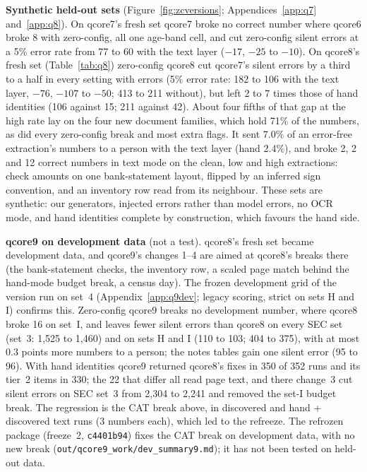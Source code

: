 \documentclass[10pt,twocolumn]{article}
\newcommand{\vq}[1]{\textsf{qcore#1}}
\newcommand{\code}[1]{\texttt{\small #1}}
\begin{document}
\textbf{Synthetic held-out sets} (Figure~\ref{fig:zcversions}; Appendices~\ref{app:q7} and~\ref{app:q8}). On \vq{7}'s fresh set \vq{7} broke no correct number where \vq{6} broke 8 with zero-config, all one age-band cell, and cut zero-config silent errors at a 5\% error rate from 77 to 60 with the text layer ($-17$, $-25$ to $-10$). On \vq{8}'s fresh set (Table~\ref{tab:q8}) zero-config \vq{8} cut \vq{7}'s silent errors by a third to a half in every setting with errors (5\% error rate: 182 to 106 with the text layer, $-76$, $-107$ to $-50$; 413 to 211 without), but left 2 to 7 times those of hand identities (106 against 15; 211 against 42). About four fifths of that gap at the high rate lay on the four new document families, which hold 71\% of the numbers, as did every zero-config break and most extra flags. It sent 7.0\% of an error-free extraction's numbers to a person with the text layer (hand 2.4\%), and broke 2, 2 and 12 correct numbers in text mode on the clean, low and high extractions: check amounts on one bank-statement layout, flipped by an inferred sign convention, and an inventory row read from its neighbour. These sets are synthetic: our generators, injected errors rather than model errors, no OCR mode, and hand identities complete by construction, which favours the hand side.

\textbf{\vq{9} on development data} (not a test). \vq{8}'s fresh set became development data, and \vq{9}'s changes 1--4 are aimed at \vq{8}'s breaks there (the bank-statement checks, the inventory row, a scaled page match behind the hand-mode budget break, a census day). The frozen development grid of the version run on set~4 (Appendix~\ref{app:q9dev}; legacy scoring, strict on sets H and I) confirms this. Zero-config \vq{9} breaks no development number, where \vq{8} broke 16 on set~I, and leaves fewer silent errors than \vq{8} on every SEC set (set~3: 1,525 to 1,460) and on sets H and I (110 to 103; 404 to 375), with at most 0.3 points more numbers to a person; the notes tables gain one silent error (95 to 96). With hand identities \vq{9} returned \vq{8}'s fixes in 350 of 352 runs and its tier~2 items in 330; the 22 that differ all read page text, and there change~3 cut silent errors on SEC set~3 from 2,304 to 2,241 and removed the set-I budget break. The regression is the CAT break above, in discovered and hand + discovered text runs (3 numbers each), which led to the refreeze. The refrozen package (freeze~2, \code{c4401b94}) fixes the CAT break on development data, with no new break (\code{out/qcore9\_work/dev\_summary9.md}); it has not been tested on held-out data.
\end{document}
